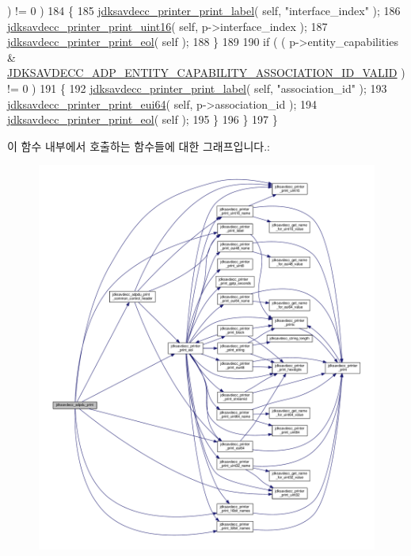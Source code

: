 \begin{DoxyCode}
       ) != 0 )
184         \{
185             \hyperlink{group__util_gaf7818b24143b3c7502926a425a242ff5}{jdksavdecc\_printer\_print\_label}( \textcolor{keyword}{self}, \textcolor{stringliteral}{"interface\_index"} );
186             \hyperlink{group__util_ga9793e0ff8e7ed25d957282ee6b257ce2}{jdksavdecc\_printer\_print\_uint16}( \textcolor{keyword}{self}, p->interface\_index );
187             \hyperlink{group__util_gacda56c9d3d24593a52c999682fa6e6e3}{jdksavdecc\_printer\_print\_eol}( \textcolor{keyword}{self} );
188         \}
189 
190         \textcolor{keywordflow}{if} ( ( p->entity\_capabilities & 
      \hyperlink{group__adp__entity__capability_gae8a98a204909a95ae1bbcf3e7f231318}{JDKSAVDECC\_ADP\_ENTITY\_CAPABILITY\_ASSOCIATION\_ID\_VALID} 
      ) != 0 )
191         \{
192             \hyperlink{group__util_gaf7818b24143b3c7502926a425a242ff5}{jdksavdecc\_printer\_print\_label}( \textcolor{keyword}{self}, \textcolor{stringliteral}{"association\_id"} );
193             \hyperlink{group__util_gafdf65e002e889f4fc89db5d1e532eaa3}{jdksavdecc\_printer\_print\_eui64}( \textcolor{keyword}{self}, p->association\_id );
194             \hyperlink{group__util_gacda56c9d3d24593a52c999682fa6e6e3}{jdksavdecc\_printer\_print\_eol}( \textcolor{keyword}{self} );
195         \}
196     \}
197 \}
\end{DoxyCode}


이 함수 내부에서 호출하는 함수들에 대한 그래프입니다.\+:
\nopagebreak
\begin{figure}[H]
\begin{center}
\leavevmode
\includegraphics[width=350pt]{group__adp__print_gaeb2bdf6561cdf20949ee640d7c3d3666_cgraph}
\end{center}
\end{figure}


